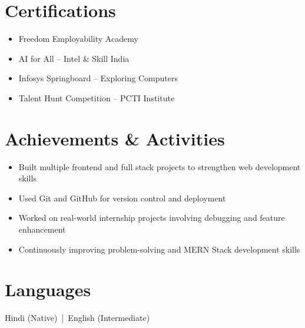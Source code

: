 \documentclass[a4paper,10pt]{article}
\newcommand{\resumeItem}[1]{
 \item \small{#1}
}
\begin{document}
\newpage

\section*{Certifications}

\begin{itemize}

\resumeItem{Freedom Employability Academy}

\resumeItem{AI for All -- Intel \& Skill India}

\resumeItem{Infosys Springboard -- Exploring Computers}

\resumeItem{Talent Hunt Competition -- PCTI Institute}

\end{itemize}

\section*{Achievements \& Activities}

\begin{itemize}

\resumeItem{Built multiple frontend and full stack projects to strengthen web development skills}

\resumeItem{Used Git and GitHub for version control and deployment}

\resumeItem{Worked on real-world internship projects involving debugging and feature enhancement}

\resumeItem{Continuously improving problem-solving and MERN Stack development skills}

\end{itemize}

\section*{Languages}

Hindi (Native) \,|\, English (Intermediate)
\end{document}
